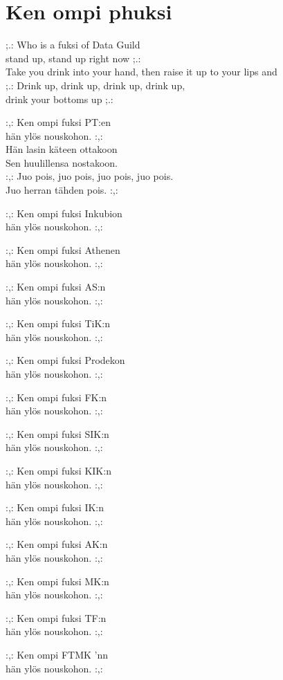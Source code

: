 \section{Ken ompi phuksi}

;.: Who is a fuksi of Data Guild\\
stand up, stand up right now ;.:\\
Take you drink into your hand, then raise it up to your lips and\\
;.: Drink up, drink up, drink up, drink up,\\
drink your bottoms up ;.:

:,: Ken ompi fuksi PT:en\\
hän ylös nouskohon. :,:\\
Hän lasin käteen ottakoon\\
Sen huulillensa nostakoon.\\
:,: Juo pois, juo pois, juo pois, juo pois.\\
Juo herran tähden pois. :,:

:,: Ken ompi fuksi Inkubion\\
hän ylös nouskohon. :,:

:,: Ken ompi fuksi Athenen\\
hän ylös nouskohon. :,:

:,: Ken ompi fuksi AS:n\\
hän ylös nouskohon. :,:

:,: Ken ompi fuksi TiK:n\\
hän ylös nouskohon. :,:

:,: Ken ompi fuksi Prodekon\\
hän ylös nouskohon. :,:

:,: Ken ompi fuksi FK:n\\
hän ylös nouskohon. :,:

:,: Ken ompi fuksi SIK:n\\
hän ylös nouskohon. :,:

:,: Ken ompi fuksi KIK:n\\
hän ylös nouskohon. :,:

:,: Ken ompi fuksi IK:n\\
hän ylös nouskohon. :,:

:,: Ken ompi fuksi AK:n\\
hän ylös nouskohon. :,:

:,: Ken ompi fuksi MK:n\\
hän ylös nouskohon. :,:

:,: Ken ompi fuksi TF:n\\
hän ylös nouskohon. :,:

:,: Ken ompi FTMK 'nn\\
hän ylös nouskohon. :,:
